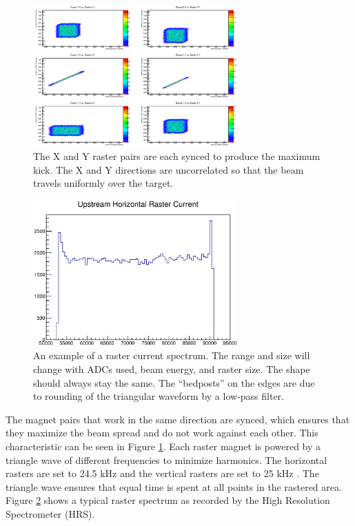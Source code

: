 \begin{figure}[h]
\begin{center}
	\includegraphics[width=0.7\textwidth]{./setup/fig/raster_sync.png}
	\caption{The X and Y raster pairs are each synced to produce the maximum kick. The X and Y directions are uncorrelated so that the beam travels uniformly over the target.}
	\label{fig:raster}
\end{center}
\end{figure}

\begin{figure}[h!]
\begin{center}
	\includegraphics[width=0.7\textwidth]{./setup/fig/ex_rast.eps}
	\caption{An example of a raster current spectrum. The range and size will change with ADCs used, beam energy, and raster size. The shape should always stay the same. The ``bedposts'' on the edges are due to rounding of the triangular waveform by a low-pass filter.}
	\label{fig:exrast}
\end{center}
\end{figure}

The magnet pairs that work in the same direction are synced, which ensures that they maximize the beam spread and do not work against each other. This characteristic can be seen in Figure \ref{fig:raster}. Each raster magnet is powered by a triangle wave of different frequencies to minimize harmonics. The horizontal rasters are set to 24.5 kHz and the vertical rasters are set to 25 kHz \cite{rast_current}. The triangle wave ensures that equal time is spent at all points in the rastered area. Figure \ref{fig:exrast} shows a typical raster spectrum as recorded by the High Resolution Spectrometer (HRS).

